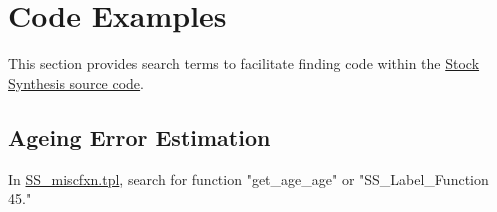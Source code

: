 \section{Code Examples}
\label{sec:codeappendix}

This section provides search terms to facilitate finding code within the \href{https://github.com/nmfs-stock-synthesis/stock-synthesis}{Stock Synthesis source code}. 

\subsection{Ageing Error Estimation}
\hypertarget{AgeingError}{}
In \href{https://github.com/nmfs-stock-synthesis/stock-synthesis/blob/main/SS_miscfxn.tpl}{SS\_miscfxn.tpl}, search for function "get\_age\_age" or "SS\_Label\_Function 45."

